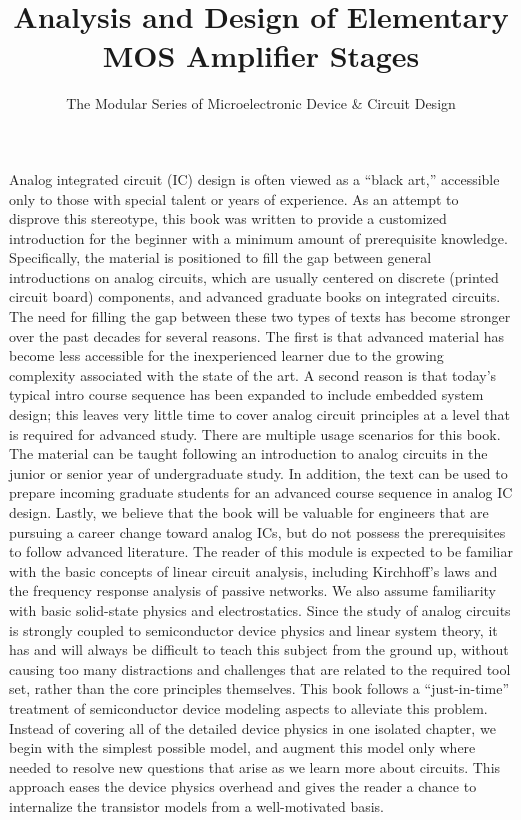 \documentclass[
  11pt,
  letterpaper,
  abstract]{scrbook}
\title{Analysis and Design of Elementary MOS Amplifier Stages}
\subtitle{The Modular Series of Microelectronic Device \& Circuit
Design}
\author{}
\date{}
\newenvironment{abstract}{%
    \chapter*{\abstractname}%
    \addcontentsline{toc}{chapter}{\abstractname}%
    \small
}{%
    \clearpage
}
\begin{document}
\frontmatter
\maketitle
\begin{abstract}
Analog integrated circuit (IC) design is often viewed as a ``black
art,'' accessible only to those with special talent or years of
experience. As an attempt to disprove this stereotype, this book was
written to provide a customized introduction for the beginner with a
minimum amount of prerequisite knowledge. Specifically, the material is
positioned to fill the gap between general introductions on analog
circuits, which are usually centered on discrete (printed circuit board)
components, and advanced graduate books on integrated circuits. The need
for filling the gap between these two types of texts has become stronger
over the past decades for several reasons. The first is that advanced
material has become less accessible for the inexperienced learner due to
the growing complexity associated with the state of the art. A second
reason is that today's typical intro course sequence has been expanded
to include embedded system design; this leaves very little time to cover
analog circuit principles at a level that is required for advanced
study. There are multiple usage scenarios for this book. The material
can be taught following an introduction to analog circuits in the junior
or senior year of undergraduate study. In addition, the text can be used
to prepare incoming graduate students for an advanced course sequence in
analog IC design. Lastly, we believe that the book will be valuable for
engineers that are pursuing a career change toward analog ICs, but do
not possess the prerequisites to follow advanced literature. The reader
of this module is expected to be familiar with the basic concepts of
linear circuit analysis, including Kirchhoff's laws and the frequency
response analysis of passive networks. We also assume familiarity with
basic solid-state physics and electrostatics. Since the study of analog
circuits is strongly coupled to semiconductor device physics and linear
system theory, it has and will always be difficult to teach this subject
from the ground up, without causing too many distractions and challenges
that are related to the required tool set, rather than the core
principles themselves. This book follows a ``just-in-time'' treatment of
semiconductor device modeling aspects to alleviate this problem. Instead
of covering all of the detailed device physics in one isolated chapter,
we begin with the simplest possible model, and augment this model only
where needed to resolve new questions that arise as we learn more about
circuits. This approach eases the device physics overhead and gives the
reader a chance to internalize the transistor models from a
well-motivated basis.
\end{abstract}
\end{document}
